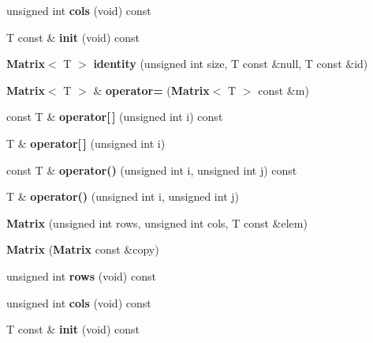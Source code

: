 \begin{DoxyCompactItemize}
\item 
unsigned int {\bfseries cols} (void) const \label{class_g_a_n_n_1_1_matrix_adc449f757249fe5bfc5bdae3c809d7e7}

\item 
T const \& {\bfseries init} (void) const \label{class_g_a_n_n_1_1_matrix_a5369d9c2dc7ae6a0941f1aba36f15259}

\item 
{\bf Matrix}$<$ T $>$ {\bfseries identity} (unsigned int size, T const \&null, T const \&id)\label{class_g_a_n_n_1_1_matrix_ae61ef07a101463ad49ab8f9f7dd4f2fe}

\item 
{\bf Matrix}$<$ T $>$ \& {\bfseries operator=} ({\bf Matrix}$<$ T $>$ const \&m)\label{class_g_a_n_n_1_1_matrix_a0aa93d1a66567637deb98c943f936fd4}

\item 
const T \& {\bfseries operator[$\,$]} (unsigned int i) const \label{class_g_a_n_n_1_1_matrix_add9f200cb6a2e53709090621e3a1150a}

\item 
T \& {\bfseries operator[$\,$]} (unsigned int i)\label{class_g_a_n_n_1_1_matrix_a700ad2c1e9ab4fd76fe1cb18092a80f1}

\item 
const T \& {\bfseries operator()} (unsigned int i, unsigned int j) const \label{class_g_a_n_n_1_1_matrix_aa3bef5292a718f45e094926602ff65ca}

\item 
T \& {\bfseries operator()} (unsigned int i, unsigned int j)\label{class_g_a_n_n_1_1_matrix_ac3f7f2d7467ba5bc95fca1890be74a38}

\item 
{\bfseries Matrix} (unsigned int rows, unsigned int cols, T const \&elem)\label{class_g_a_n_n_1_1_matrix_a370ad3ace72e48cf5ac3d2fd672dd679}

\item 
{\bfseries Matrix} ({\bf Matrix} const \&copy)\label{class_g_a_n_n_1_1_matrix_a9af1de05104cf864d0089575e772b74b}

\item 
unsigned int {\bfseries rows} (void) const \label{class_g_a_n_n_1_1_matrix_a14c1233ee25f1cd5823676277e1956f2}

\item 
unsigned int {\bfseries cols} (void) const \label{class_g_a_n_n_1_1_matrix_adc449f757249fe5bfc5bdae3c809d7e7}

\item 
T const \& {\bfseries init} (void) const \label{class_g_a_n_n_1_1_matrix_a5369d9c2dc7ae6a0941f1aba36f15259}


\end{DoxyCompactItemize}
